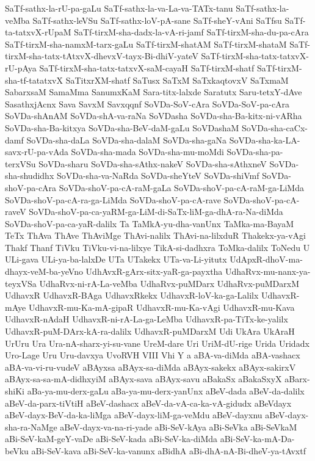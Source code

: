 {SaTf-sathx-la-rU-pa-gaLu
SaTf-sathx-la-va-La-va-TATx-tanu
SaTf-sathx-la-veMba
SaTf-sathx-leVSu
SaTf-sathx-loV-pA-sane
SaTf-sheY-vAni
SaTfsu
SaTf-ta-tatxvX-rUpaM
SaTf-tirxM-sha-dadx-la-vA-ri-jamf
SaTf-tirxM-sha-du-pa-cAra
SaTf-tirxM-sha-namxM-tarx-gaLu
SaTf-tirxM-shatAM
SaTf-tirxM-shataM
SaTf-tirxM-sha-tatx-tAtxvX-dhevxV-tayx-Bi-dhiV-yateV
SaTf-tirxM-sha-tatx-tatxvX-rU-pAya
SaTf-tirxM-sha-tatx-tatxvX-saM-cayaH
SaTf-tirxM-shatf
SaTf-tirxM-sha-tf-tatatxvX
SaTitxrXM-shatf
SaTusx
SaTxM
SaTxkaqtovxV
SaTxmaM
SabarxsaM
SamaMma
SanumxKaM
Sara-titx-lalxde
Saratutx
Saru-tetxY-dAve
SasathxjAcnx
Sava
SavxM
Savxqqnf
SoVDa-SoV-cAra
SoVDa-SoV-pa-cAra
SoVDa-shAnAM
SoVDa-shA-va-raNa
SoVDasha
SoVDa-sha-Ba-kitx-ni-vARha
SoVDa-sha-Ba-kitxya
SoVDa-sha-BeV-daM-gaLu
SoVDashaM
SoVDa-sha-caCx-damf
SoVDa-sha-daLa
SoVDa-sha-dalaM
SoVDa-sha-gaNa
SoVDa-sha-ka-LA-savx-rU-pa-vAda
SoVDa-sha-mada
SoVDa-sha-mu-moMdi
SoVDa-sha-pa-terxVSu
SoVDa-sharu
SoVDa-sha-sAthx-nakeV
SoVDa-sha-sAthxneV
SoVDa-sha-shudidhx
SoVDa-sha-va-NaRda
SoVDa-sheYteV
SoVDa-shiVmf
SoVDa-shoV-pa-cAra
SoVDa-shoV-pa-cA-raM-gaLa
SoVDa-shoV-pa-cA-raM-ga-LiMda
SoVDa-shoV-pa-cA-ra-ga-LiMda
SoVDa-shoV-pa-cA-rave
SoVDa-shoV-pa-cA-raveV
SoVDa-shoV-pa-ca-yaRM-ga-LiM-di-SaTx-liM-ga-dhA-ra-Na-diMda
SoVDa-shoV-pa-ca-yaR-dalilx
Ta
TaMkA-yu-dha-vanUnx
TaMka-ma-BayaM
TeTx
ThAva
ThAve
ThAviMge
ThAvi-nalilx
ThAvi-na-lilxduR
Thakekx-ya-vAgi
Thakf
Thanf
TiVku
TiVku-vi-na-lilxye
TikA-si-dadhxra
ToMka-dalilx
ToNedu
U
ULi-gava
ULi-ya-ba-lalxDe
UTa
UTakekx
UTa-va-Li-yitutx
UdApxR-dhoV-ma-dhayx-veM-ba-yeVno
UdhAvxR-gArx-sitx-yaR-ga-payxtha
UdhaRvx-mu-nanx-ya-teyxVSa
UdhaRvx-ni-rA-La-veMba
UdhaRvx-puMDarx
UdhaRvx-puMDarxM
UdhavxR
UdhavxR-BAga
UdhavxRkekx
UdhavxR-loV-ka-ga-Lalilx
UdhavxR-mAye
UdhavxR-mu-Ka-mA-gipaR
UdhavxR-mu-Ka-vAgi
UdhavxR-mu-Kava
UdhavxR-nAdaH
UdhavxR-ni-rA-La-ga-LeMba
UdhavxR-pa-TiTx-ke-yalilx
UdhavxR-puM-DArx-kA-ra-dalilx
UdhavxR-puMDarxM
Udi
UkAra
UkAraH
UrUru
Ura
Ura-nA-sharx-yi-su-vane
UreM-dare
Uri
UriM-dU-rige
Urida
Uridadx
Uro-Lage
Uru
Uru-davxya
UvoRVH
VIII
Vhi
Y
a
aBA-va-diMda
aBA-vashacx
aBA-va-vi-ru-vudeV
aBAyxsa
aBAyx-sa-diMda
aBAyx-sakekx
aBAyx-sakirxV
aBAyx-sa-sa-mA-didhxyiM
aBAyx-sava
aBAyx-savu
aBakaSx
aBakaSxyX
aBarx-shiKi
aBa-ya-mu-derx-gaLu
aBa-ya-mu-derx-yanUnx
aBeV-dada
aBeV-da-dalilx
aBeV-da-parx-tiVtiH
aBeV-dashacx
aBeV-da-vA-ca-ka-vA-gidudx
aBeVdayx
aBeV-dayx-BeV-da-ka-liMga
aBeV-dayx-liM-ga-veMdu
aBeV-dayxnu
aBeV-dayx-sha-ra-NaMge
aBeV-dayx-va-na-ri-yade
aBi-SeV-kAya
aBi-SeVka
aBi-SeVkaM
aBi-SeV-kaM-geY-vaDe
aBi-SeV-kada
aBi-SeV-ka-diMda
aBi-SeV-ka-mA-Da-beVku
aBi-SeV-kava
aBi-SeV-ka-vanunx
aBidhA
aBi-dhA-nA-Bi-dheV-ya-tAvxtf
}
